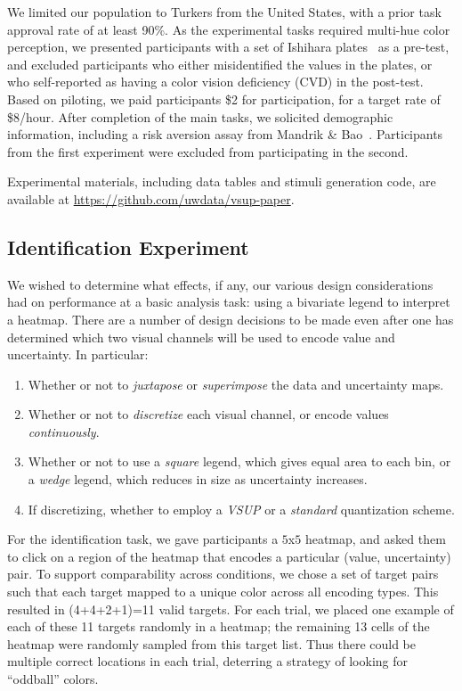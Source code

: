 We limited our population to Turkers from the United States, with a prior task approval rate of at least 90\%. As the experimental tasks required multi-hue color perception, we presented participants with a set of Ishihara plates~\cite{hardy1945tests} as a pre-test, and excluded participants who either misidentified the values in the plates, or who self-reported as having a color vision deficiency (CVD) in the post-test. Based on piloting, we paid participants \$2 for participation, for a target rate of \$8/hour. After completion of the main tasks, we solicited demographic information, including a risk aversion assay from Mandrik \& Bao~\cite{mandrik2005exploring}. Participants from the first experiment were excluded from participating in the second.

Experimental materials, including data tables and stimuli generation code, are available at \url{https://github.com/uwdata/vsup-paper}.

\subsection{Identification Experiment}

We wished to determine what effects, if any, our various design considerations had on performance at a basic analysis task: using a bivariate legend to interpret a heatmap. There are a number of design decisions to be made even after one has determined which two visual channels will be used to encode value and uncertainty.
In particular:
\begin{enumerate}
	\item Whether or not to \emph{juxtapose} or \emph{superimpose} the data and uncertainty maps.
	\item Whether or not to \emph{discretize} each visual channel, or encode values \emph{continuously}.
	\item Whether or not to use a \emph{square} legend, which gives equal area to each bin, or a \emph{wedge} legend, which reduces in size as uncertainty increases.
	\item If discretizing, whether to employ a \emph{VSUP} or a \emph{standard} quantization scheme.
\end{enumerate}

For the identification task, we gave participants a $5$x$5$ heatmap, and asked them to click on a region of the heatmap that encodes a particular (value, uncertainty) pair. To support comparability across conditions, we chose a set of target pairs such that each target mapped to a unique color across all encoding types. This resulted in (4+4+2+1)=11 valid targets. For each trial, we placed one example of each of these 11 targets randomly in a heatmap; the remaining 13 cells of the heatmap were randomly sampled from this target list. Thus there could be multiple correct locations in each trial, deterring a strategy of looking for ``oddball'' colors. 

